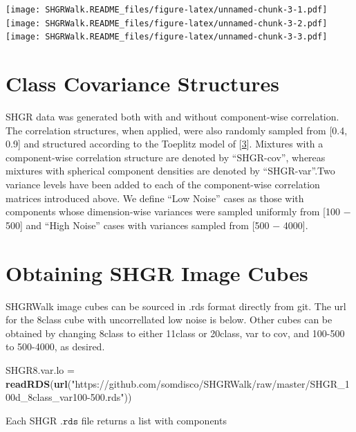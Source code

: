\documentclass[]{article}
\newenvironment{Shaded}{\begin{snugshade}}{\end{snugshade}}
\newcommand{\KeywordTok}[1]{\textcolor[rgb]{0.13,0.29,0.53}{\textbf{#1}}}
\newcommand{\NormalTok}[1]{#1}
\newcommand{\StringTok}[1]{\textcolor[rgb]{0.31,0.60,0.02}{#1}}
\begin{document}
\texttt{[image: SHGRWalk.README\_files/figure-latex/unnamed-chunk-3-1.pdf]} \texttt{[image: SHGRWalk.README\_files/figure-latex/unnamed-chunk-3-2.pdf]} \texttt{[image: SHGRWalk.README\_files/figure-latex/unnamed-chunk-3-3.pdf]}

\hypertarget{class-covariance-structures}{%
\section{Class Covariance Structures}\label{class-covariance-structures}}

SHGR data was generated both with and without component-wise correlation. The correlation structures, when applied, were also randomly sampled from {[}0.4, 0.9{]} and structured according to the Toeplitz model of {[}\protect\hyperlink{ref-Toeplitz}{3}{]}. Mixtures with a component-wise correlation structure are denoted by ``SHGR-cov'', whereas mixtures with spherical component densities are denoted by ``SHGR-var''.Two variance levels have been added to each of the component-wise correlation matrices introduced above. We define ``Low Noise'' cases as those with components whose dimension-wise variances were sampled uniformly from {[}100 − 500{]} and ``High Noise'' cases with variances sampled from {[}500 − 4000{]}.

\hypertarget{obtaining-shgr-image-cubes}{%
\section{Obtaining SHGR Image Cubes}\label{obtaining-shgr-image-cubes}}

SHGRWalk image cubes can be sourced in .rds format directly from git. The url for the 8class cube with uncorrellated low noise is below. Other cubes can be obtained by changing 8class to either 11class or 20class, var to cov, and 100-500 to 500-4000, as desired.

\begin{Shaded}
\begin{Highlighting}[]
\NormalTok{SHGR8.var.lo =}\StringTok{ }\KeywordTok{readRDS}\NormalTok{(}\KeywordTok{url}\NormalTok{(}\StringTok{"https://github.com/somdisco/SHGRWalk/raw/master/SHGR_100d_8class_var100-500.rds"}\NormalTok{))}
\end{Highlighting}
\end{Shaded}

Each SHGR \(\texttt{.rds}\) file returns a list with components
\end{document}

